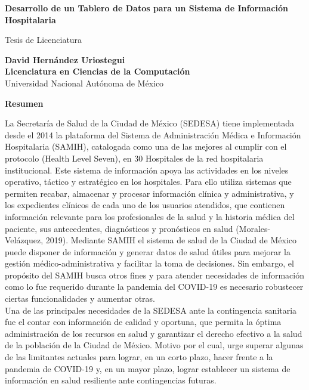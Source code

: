
\begin{center}
\large{\bf Desarrollo de un Tablero de Datos para un Sistema de Información Hospitalaria}

\normalsize{Tesis de Licenciatura}\\
\vspace{0.5cm}

\normalsize{\bf David Hernández Uriostegui\\
Licenciatura en Ciencias de la Computación}\\
Universidad Nacional Autónoma de México

\vspace{1.0cm}

\large{\textbf{Resumen\\}}

\end{center}
La Secretaría de Salud de la Ciudad de México (SEDESA) tiene implementada desde el 2014 la plataforma del Sistema de Administración Médica e Información Hospitalaria (SAMIH), catalogada como una de las mejores al cumplir con el protocolo  (Health Level Seven), en 30 Hospitales de la red hospitalaria institucional. Este sistema de información apoya las actividades en los niveles operativo, táctico y estratégico en los hospitales. Para ello utiliza sistemas que permiten recabar, almacenar y procesar información clínica y administrativa, y los expedientes clínicos de cada uno de los usuarios atendidos, que contienen información relevante para los profesionales de la salud y la historia médica del paciente, sus antecedentes, diagnósticos y pronósticos en salud (Morales-Velázquez, 2019). Mediante SAMIH el sistema de salud de la Ciudad de México puede disponer de información y generar datos de salud útiles para mejorar la gestión médico-administrativa y facilitar la toma de decisiones. Sin embargo, el propósito del SAMIH busca otros fines y para atender necesidades de información como lo fue requerido durante la pandemia del COVID-19 es necesario robustecer ciertas funcionalidades y aumentar otras.\\

Una de las principales necesidades de la SEDESA ante la contingencia sanitaria fue el contar con información de calidad y oportuna, que permita la óptima administración de los recursos en salud y garantizar el derecho efectivo a la salud de la población de la Ciudad de México. Motivo por el cual, urge superar algunas de las limitantes actuales para lograr, en un corto plazo, hacer frente a la pandemia de COVID-19 y, en un mayor plazo, lograr establecer un sistema de información en salud resiliente ante contingencias futuras.\\

